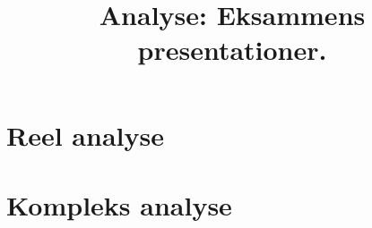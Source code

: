 \documentclass[a4paper, oneside]{book}
\title{Analyse: Eksammens presentationer.}
\begin{document}
\maketitle

\chapter{Reel analyse}

\chapter{Kompleks analyse}

\end{document}
